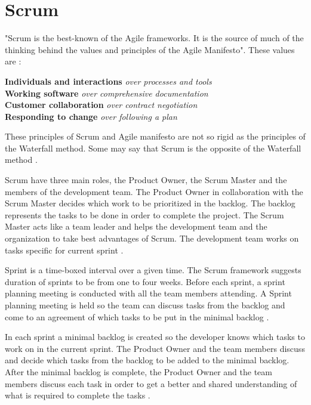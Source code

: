 \documentclass[UKenglish]{ifimaster}  %
\begin{document}
\section {Scrum}
\label{sec:Scrum}
"Scrum is the best-known of the Agile frameworks. It is the source of much of the thinking behind the values and principles of the Agile Manifesto". These values are \parencite{Scrum}:

\begin{center}
\textbf{Individuals and interactions}  \textit{over processes and tools} \\
\textbf{Working software} \textit{over comprehensive documentation} \\
\textbf{Customer collaboration} \textit{over contract negotiation} \\
\textbf{Responding to change} \textit{over following a plan} \\
\end{center}

These principles of Scrum and Agile manifesto are not so rigid as the principles of the Waterfall method. Some may say that Scrum is the opposite of the Waterfall method \parencite{cocco2011simulating}. 

Scrum have three main roles, the Product Owner, the Scrum Master and the members of the development team. The Product Owner in collaboration with the Scrum Master decides which work to be prioritized in the backlog. The backlog represents the tasks to be done in order to complete the project. The Scrum Master acts like a team leader and helps the development team and the organization to take best advantages of Scrum. The development team works on tasks specific for current sprint \parencite{Scrum}.

Sprint is a time-boxed interval over a given time. The Scrum framework suggests duration of sprints to be from one to four weeks. Before each sprint, a sprint planning meeting is conducted with all the team members attending.  A Sprint planning meeting is held so the team can discuss tasks from the backlog and come to an agreement of which tasks to be put in the minimal backlog \parencite{Scrum}.

In each sprint a minimal backlog is created so the developer knows which tasks to work on in the current sprint. The Product Owner and the team members discuss and decide which tasks from the backlog to be added to the minimal backlog. After the minimal backlog is complete, the Product Owner and the team members discuss each task in order to get a better and shared understanding of what is required to complete the tasks \parencite{Scrum}. 
\end{document}
